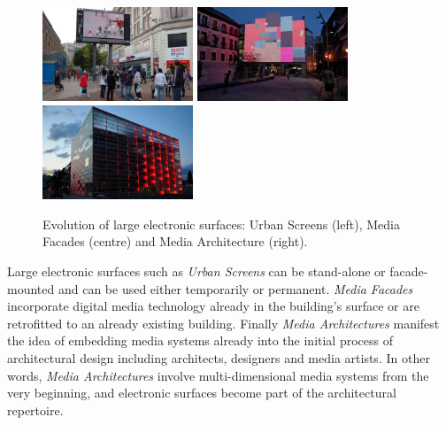 \begin{figure} [h!]
    \centering
        \includegraphics[width=4.5cm]{Illustrations/3.jpg}
        \includegraphics[width=4.5cm]{Illustrations/2.jpeg}
        \includegraphics[width=4.5cm]{Illustrations/1.jpg}
    \caption[Types of electronic surfaces]{Evolution of large electronic surfaces: Urban Screens (left), Media Facades (centre) and Media Architecture (right).}
    \label{TypesOfSurfaces}
\end{figure}


Large electronic surfaces such as \textit{Urban Screens} can be stand-alone or facade-mounted and can be used either temporarily or permanent. 
\textit{Media Facades} incorporate digital media technology already in the building’s surface or are retrofitted to an already existing building. 
Finally \textit{Media Architectures} manifest the idea of embedding media systems already into the initial process of architectural design including architects, designers and media artists. In other words, \textit{Media Architectures} involve multi-dimensional media systems from the very beginning, and electronic surfaces become part of the architectural repertoire.

